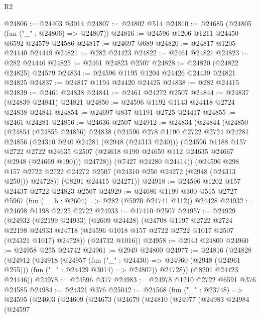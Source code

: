 \begin{lexlean}{R2}
\begin{coremodule}
@24806 := @24403 @3014
@24807 := @24802 @514
@24810 := @24685 (@24805 (fun ("_" : @24806) => @24807))
@24816 := @24596 @1206 @1211 @24450 @6592 @24579 @24586
@24817 := @24697 @689
@24820 := @24817 @1205 @24440 @24449
@24821 := @282 @24423
@24822 := @2461 @24821
@24823 := @282 @24446
@24825 := @2461 @24823 @2507
@24828 := @24820 (@24822 @24825) @24579
@24834 := @24596 @1195 @1204 @24426 @24439 @24821 @24825
@24837 := @24817 @1194 @24420 @24425
@24838 := @282 @24415
@24839 := @2461 @24838
@24841 := @2461 @24272 @2507
@24844 := @24837 (@24839 @24841) @24821
@24850 := @24596 @1192 @1143 @24418 @2724 @24838 @24841
@24854 := @24697 @837 @1191 @2725 @24417
@24855 := @2461 @24281
@24856 := @24636 @2507
@24912 := @24834
    (@24844
      (@24850
        (@24854
          (@24855 @24856)
          @24838
          (@24596
            @278
            @1190
            @2722
            @2724
            @24281
            @24856
            (@24310 @240 @24281 (@2948 (@24313 @240)))
            (@24596
              @1188
              @157
              @2722
              @2722
              @24635
              @2507
              (@24618 @190 @24659 @112 @24635 @24667 (@2948 (@24669 @190)))
              @24728))
          (@7427 @24280 @24414))
        (@24596
          @298
          @157
          @2722
          @2722
          @24272
          @2507
          (@24310 @250 @24272 (@2948 (@24313 @250)))
          @24728))
      (@8201 @24415 @24271))
@24918 := @24596 @1202 @157 @24437 @2722 @24823 @2507
@24929 := @24686 @1199 @300 @515 @2727 @5967 (fun (__b : @2604) => @282 (@5920 @24741 @112)) @24428
@24932 := @24698 @1198 @2725 @2722
@24933 := @17410 @2507
@24957 := @24929
    (@24932
      (@22199 @24933)
      (@2609 @24428)
      (@24708
        @1197
        @2722
        @2724
        @22198
        @24933
        @24718
        (@24596 @1018 @157 @2722 @2722 @1017 @2507 (@24321 @1017) @24728))
      (@24732 @1016))
@24958 := @2943 @24800
@24960 := @24958 @255 @24742
@24961 := @2949 @24800
@24977 := @24816
    (@24828
      (@24912
        (@24918
          (@24957
            (fun ("_" : @24430) => @24960 (@2948 (@24961 @255)))
            (fun ("_" : @24429 @3014) => @24807))
          @24728))
      (@8201 @24423 @24446))
@24978 := @24596 @377
@24983 := @24978 @1210 @2722 @6591 @376 @24585
@24984 := @24321 @376
@25042 := @24568
    (fun ("_" : @23748) =>
    @24595
      (@24603
        (@24609
          (@24673
            (@24679
              (@24810
                (@24977
                  (@24983
                    @24984
                    (@24597

\end{coremodule}
\end{lexlean}
